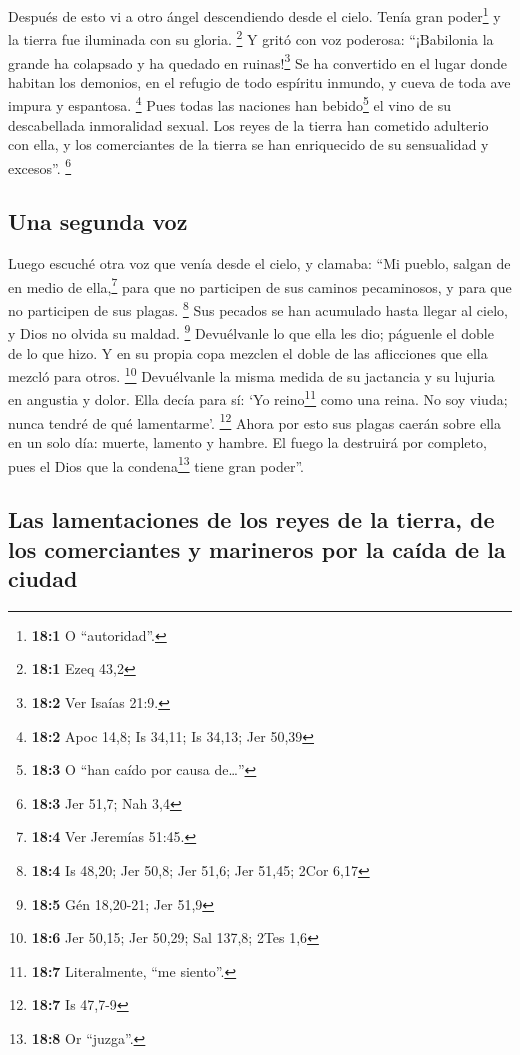 Después de esto vi a otro ángel descendiendo desde el
cielo. Tenía gran poder\footnote{\textbf{18:1} O ``autoridad''.} y la
tierra fue iluminada con su gloria. \footnote{\textbf{18:1} Ezeq 43,2}
 Y gritó con voz poderosa: ``¡Babilonia la grande ha
colapsado y ha quedado en ruinas!\footnote{\textbf{18:2} Ver Isaías
  21:9.} Se ha convertido en el lugar donde habitan los demonios, en el
refugio de todo espíritu inmundo, y cueva de toda ave impura y
espantosa. \footnote{\textbf{18:2} Apoc 14,8; Is 34,11; Is 34,13; Jer
  50,39}  Pues todas las naciones han bebido\footnote{\textbf{18:3}
  O ``han caído por causa de\ldots''} el vino de su descabellada
inmoralidad sexual. Los reyes de la tierra han cometido adulterio con
ella, y los comerciantes de la tierra se han enriquecido de su
sensualidad y excesos''. \footnote{\textbf{18:3} Jer 51,7; Nah 3,4}

\hypertarget{una-segunda-voz}{%
\subsection{Una segunda voz}\label{una-segunda-voz}}

 Luego escuché otra voz que venía desde el cielo, y
clamaba: ``Mi pueblo, salgan de en medio de ella,\footnote{\textbf{18:4}
  Ver Jeremías 51:45.} para que no participen de sus caminos
pecaminosos, y para que no participen de sus plagas. \footnote{\textbf{18:4}
  Is 48,20; Jer 50,8; Jer 51,6; Jer 51,45; 2Cor 6,17}  Sus
pecados se han acumulado hasta llegar al cielo, y Dios no olvida su
maldad. \footnote{\textbf{18:5} Gén 18,20-21; Jer 51,9} 
Devuélvanle lo que ella les dio; páguenle el doble de lo que hizo. Y en
su propia copa mezclen el doble de las aflicciones que ella mezcló para
otros. \footnote{\textbf{18:6} Jer 50,15; Jer 50,29; Sal 137,8; 2Tes 1,6}
 Devuélvanle la misma medida de su jactancia y su lujuria
en angustia y dolor. Ella decía para sí: `Yo reino\footnote{\textbf{18:7}
  Literalmente, ``me siento''.} como una reina. No soy viuda; nunca
tendré de qué lamentarme'. \footnote{\textbf{18:7} Is 47,7-9}
 Ahora por esto sus plagas caerán sobre ella en un solo
día: muerte, lamento y hambre. El fuego la destruirá por completo, pues
el Dios que la condena\footnote{\textbf{18:8} Or ``juzga''.} tiene gran
poder''.

\hypertarget{las-lamentaciones-de-los-reyes-de-la-tierra-de-los-comerciantes-y-marineros-por-la-cauxedda-de-la-ciudad}{%
\subsection{Las lamentaciones de los reyes de la tierra, de los
comerciantes y marineros por la caída de la
ciudad}\label{las-lamentaciones-de-los-reyes-de-la-tierra-de-los-comerciantes-y-marineros-por-la-cauxedda-de-la-ciudad}}

